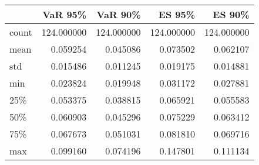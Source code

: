 \begin{tabular}{lrrrr}
\toprule
{} &     VaR 95\% &     VaR 90\% &      ES 95\% &      ES 90\% \\
\midrule
count &  124.000000 &  124.000000 &  124.000000 &  124.000000 \\
mean  &    0.059254 &    0.045086 &    0.073502 &    0.062107 \\
std   &    0.015486 &    0.011245 &    0.019175 &    0.014881 \\
min   &    0.023824 &    0.019948 &    0.031172 &    0.027881 \\
25\%   &    0.053375 &    0.038815 &    0.065921 &    0.055583 \\
50\%   &    0.060903 &    0.045296 &    0.075229 &    0.063412 \\
75\%   &    0.067673 &    0.051031 &    0.081810 &    0.069716 \\
max   &    0.099160 &    0.074196 &    0.147801 &    0.111134 \\
\bottomrule
\end{tabular}

